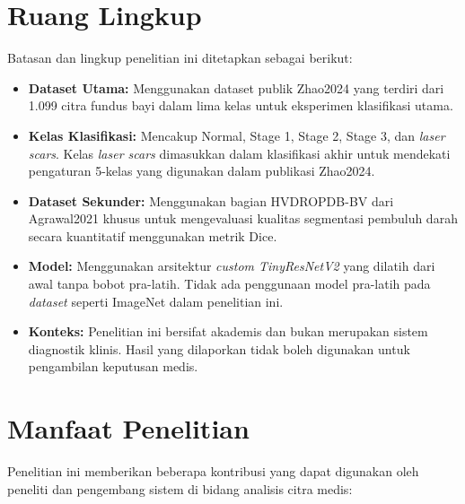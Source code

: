 \section{Ruang Lingkup}

Batasan dan lingkup penelitian ini ditetapkan sebagai berikut:

\begin{itemize}
    \item \textbf{Dataset Utama:} Menggunakan dataset publik Zhao2024 \citep{Zhao2024} yang
    terdiri dari 1.099 citra fundus bayi dalam lima kelas untuk eksperimen klasifikasi utama.
    \item \textbf{Kelas Klasifikasi:} Mencakup Normal, Stage 1, Stage 2, Stage 3, dan
    \textit{laser scars}. Kelas \textit{laser scars} dimasukkan dalam klasifikasi akhir
    untuk mendekati pengaturan 5-kelas yang digunakan dalam publikasi Zhao2024.
    \item \textbf{Dataset Sekunder:} Menggunakan bagian HVDROPDB-BV dari Agrawal2021
    \citep{Agrawal2021} khusus untuk mengevaluasi kualitas segmentasi pembuluh darah secara
    kuantitatif menggunakan metrik Dice.
    \item \textbf{Model:} Menggunakan arsitektur \textit{custom TinyResNetV2} yang dilatih
    dari awal tanpa bobot pra-latih. Tidak ada penggunaan model pra-latih pada \textit{dataset}
    seperti ImageNet dalam penelitian ini.
    \item \textbf{Konteks:} Penelitian ini bersifat akademis dan bukan merupakan sistem
    diagnostik klinis. Hasil yang dilaporkan tidak boleh digunakan untuk pengambilan keputusan
    medis.
\end{itemize}

\section{Manfaat Penelitian}

Penelitian ini memberikan beberapa kontribusi yang dapat digunakan oleh peneliti dan
pengembang sistem di bidang analisis citra medis:

